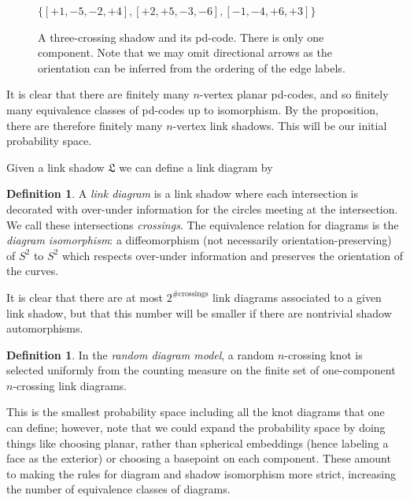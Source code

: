 \documentclass[amsmath,secnumarabic,amssymb,floatfix,nofootinbib,nobibnotes,letterpaper,11pt,tightenlines,showkeys]{revtex4}
\theoremstyle{definition}
\newtheorem{definition}[theorem]{Definition}
\let\mgp=\marginpar \marginparwidth18mm \marginparsep1mm
\def\marginpar#1{\mgp{\raggedright\tiny #1}}
\let\lbl=\label
\def\label#1{\lbl{#1}\ifinner\else\marginpar{\ref{#1} #1}\ignorespaces\fi}
\begin{document}
\begin{figure}[H]
\begin{center}
\hphantom{.}
\hfill
{}
\hfill
$\{[+1,-5,-2,+4],[+2,+5,-3,-6],[-1,-4,+6,+3]\}$
\hfill
\hphantom{.}
\end{center}
\caption{\label{fig:PD} A three-crossing shadow and its pd-code. There is only one component. Note that we may omit directional arrows as the orientation can be inferred from the ordering of the edge labels.}
\end{figure}
It is clear that there are finitely many $n$-vertex planar pd-codes, and so finitely many equivalence classes of pd-codes up to isomorphism. By the proposition, there are therefore finitely many $n$-vertex link shadows. This will be our initial probability space.

Given a link shadow $\mathfrak{L}$ we can define a link diagram by
\begin{definition}
A \emph{link diagram} is a link shadow where each intersection is decorated with over-under information for the circles meeting at the intersection. We call these intersections \emph{crossings}. The equivalence relation for diagrams is the \emph{diagram isomorphism}: a diffeomorphism (not necessarily orientation-preserving) of $S^2$ to $S^2$ which respects over-under information and preserves the orientation of the curves.
\end{definition}
It is clear that there are at most $2^{\text{\# crossings}}$ link diagrams associated to a given link shadow, but that this number will be smaller if there are nontrivial shadow automorphisms.
\begin{definition}
In the \emph{random diagram model}, a random $n$-crossing knot is selected uniformly from the counting measure on the finite set of one-component $n$-crossing link diagrams.
\end{definition}
This is the smallest probability space including all the knot diagrams that one can define; however, note that we could expand the probability space by doing things like choosing planar, rather than spherical embeddings (hence labeling a face as the exterior) or choosing a basepoint on each component. These amount to making the rules for diagram and shadow isomorphism more strict, increasing the number of equivalence classes of diagrams.
\end{document}
